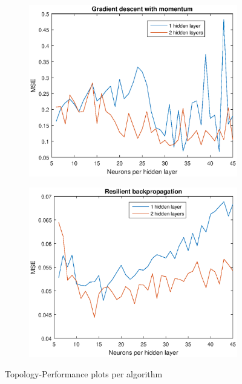 \documentclass{article}
\begin{document}
\begin{figure}
\ContinuedFloat
\centering
 \begin{subfigure}[b]{.8\textwidth}
   \includegraphics[width=\textwidth]{traingdm_plot.eps}
 \end{subfigure}
 \begin{subfigure}[b]{.8\textwidth}
   \includegraphics[width=\textwidth]{trainrp_plot.eps}
 \end{subfigure}
 \caption{Topology-Performance plots per algorithm}
 \label{fig:topologyPerformance}
\end{figure}
\end{document}
